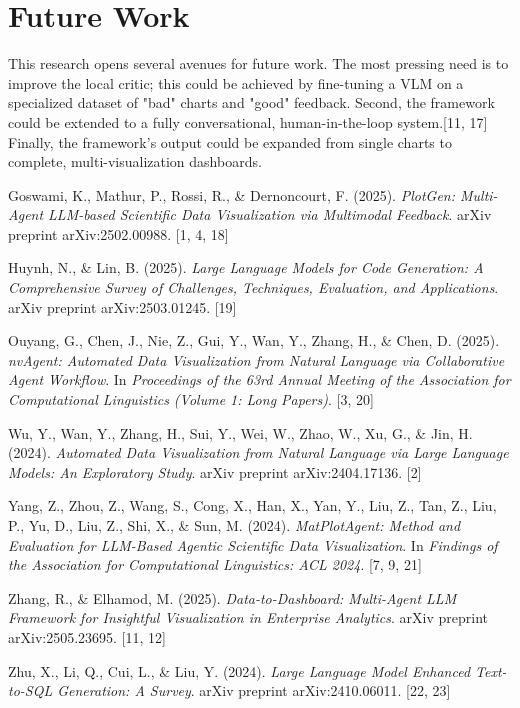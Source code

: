 \documentclass[a4paper,oneside,bibliography=totoc]{scrbook}
\begin{document}
\section{Future Work}
\label{sec:future_work}
This research opens several avenues for future work. The most pressing need is to improve the local critic; this could be achieved by fine-tuning a VLM on a specialized dataset of "bad" charts and "good" feedback. Second, the framework could be extended to a fully conversational, human-in-the-loop system.[11, 17] Finally, the framework's output could be expanded from single charts to complete, multi-visualization dashboards.

\begin{thebibliography}{}

Goswami, K., Mathur, P., Rossi, R., \& Dernoncourt, F. (2025).
\textit{PlotGen: Multi-Agent LLM-based Scientific Data Visualization via Multimodal Feedback}.
arXiv preprint arXiv:2502.00988. [1, 4, 18]

Huynh, N., \& Lin, B. (2025).
\textit{Large Language Models for Code Generation: A Comprehensive Survey of Challenges, Techniques, Evaluation, and Applications}.
arXiv preprint arXiv:2503.01245. [19]

Ouyang, G., Chen, J., Nie, Z., Gui, Y., Wan, Y., Zhang, H., \& Chen, D. (2025).
\textit{nvAgent: Automated Data Visualization from Natural Language via Collaborative Agent Workflow}.
In \textit{Proceedings of the 63rd Annual Meeting of the Association for Computational Linguistics (Volume 1: Long Papers)}. [3, 20]

Wu, Y., Wan, Y., Zhang, H., Sui, Y., Wei, W., Zhao, W., Xu, G., \& Jin, H. (2024).
\textit{Automated Data Visualization from Natural Language via Large Language Models: An Exploratory Study}.
arXiv preprint arXiv:2404.17136. [2]

Yang, Z., Zhou, Z., Wang, S., Cong, X., Han, X., Yan, Y., Liu, Z., Tan, Z., Liu, P., Yu, D., Liu, Z., Shi, X., \& Sun, M. (2024).
\textit{MatPlotAgent: Method and Evaluation for LLM-Based Agentic Scientific Data Visualization}.
In \textit{Findings of the Association for Computational Linguistics: ACL 2024}. [7, 9, 21]

Zhang, R., \& Elhamod, M. (2025).
\textit{Data-to-Dashboard: Multi-Agent LLM Framework for Insightful Visualization in Enterprise Analytics}.
arXiv preprint arXiv:2505.23695. [11, 12]

Zhu, X., Li, Q., Cui, L., \& Liu, Y. (2024).
\textit{Large Language Model Enhanced Text-to-SQL Generation: A Survey}.
arXiv preprint arXiv:2410.06011. [22, 23]

\end{thebibliography}
\end{document}
